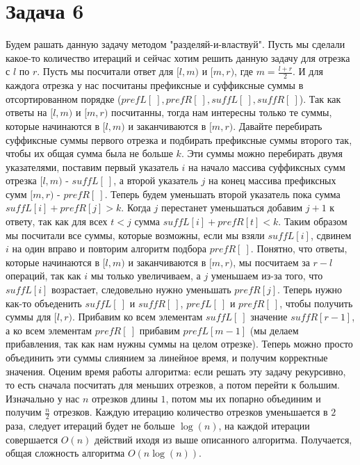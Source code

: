 \documentclass{article}
\begin{document}
	\section*{Задача 6}
	Будем рашать данную задачу методом "разделяй-и-властвуй". Пусть мы сделали какое-то количество итераций и сейчас хотим решить данную задачу для отрезка с $l$ по $r$. Пусть мы посчитали ответ для $[l, m)$ и $[m, r)$, где $m = \frac{l + r}{2}$. И для каждога отрезка у нас посчитаны префиксные и суффиксные суммы в отсортированном порядке ($prefL[\ ], prefR[\ ], suffL[\ ], suffR[\ ]$). Так как ответы на $[l, m)$ и $[m, r)$ посчитанны, тогда нам интересны только те суммы, которые начинаются в $[l, m)$ и заканчиваются в $[m, r)$. Давайте перебирать суффиксные суммы первого отрезка и подбирать префиксные суммы второго так, чтобы их общая сумма была не больше $k$. Эти суммы можно перебирать двумя указателями, поставим первый указатель $i$ на начало массива суффиксных сумм отрезка $[l, m)$ - $suffL[\ ]$, а второй указатель $j$ на конец массива префиксных сумм $[m, r)$ - $prefR[\ ]$. Теперь будем уменьшать второй указатель пока сумма $suffL[i] + prefR[j] > k$. Когда $j$ перестанет уменьшаться добавим $j + 1$ к ответу, так как для всех $t < j$ сумма $suffL[i] + prefR[t] < k$. Таким образом мы посчитали все суммы, которые возможны, если мы взяли $suffL[i]$, сдвинем $i$ на один вправо и повторим алгоритм подбора $prefR[\ ]$. Понятно, что ответы, которые начинаются в $[l, m)$ и заканчиваются в $[m, r)$, мы посчитаем за $r - l$ операций, так как $i$ мы только увеличиваем, а $j$ уменьшаем из-за того, что $suffL[i]$ возрастает, следовельно нужно уменьшать $prefR[j]$. Теперь нужно как-то объеденить $suffL[\ ]$ и $suffR[\ ]$, $prefL[\ ]$ и $prefR[\ ]$, чтобы получить суммы для $[l, r)$. Прибавим ко всем элементам $suffL[\ ]$ значение $suffR[r - 1]$, а ко всем элементам $prefR[\  ]$ прибавим $prefL[m - 1]$ (мы делаем прибавления, так как нам нужны суммы на целом отрезке). Теперь можно просто объединить эти суммы слиянием за линейное время, и получим корректные значения. Оценим время работы алгоритма: если решать эту задачу рекурсивно, то есть сначала посчитать для меньших отрезков, а потом перейти к большим. Изначально у нас $n$ отрезков длины $1$, потом мы их попарно объединим и получим $\frac{n}{2}$ отрезков. Каждую итерацию количество отрезков уменьшается в $2$ раза, следует итераций будет не больше $\log(n)$, на каждой итерации совершается $O(n)$ действий иходя из выше описанного алгоритма. Получается, общая сложность алгоритма $O(n\log(n))$. 
	
	
	
\end{document}
